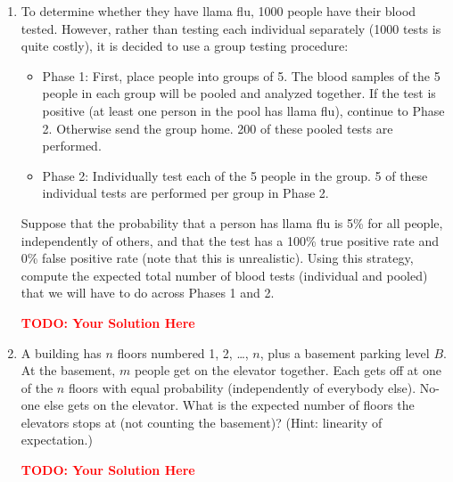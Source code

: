 \documentclass[12pt]{article}
\def\todo#1{\textcolor{red}{\textbf{#1}}}
\renewcommand{\|}{\mid}
\begin{document}
\begin{enumerate}
\item To determine whether they have llama flu, 1000 people have their blood tested. However, rather than testing each individual separately (1000 tests is quite costly), it is decided to use a group testing procedure:
\begin{itemize}
    \item Phase 1: First, place people into groups of 5. The blood samples of the 5 people in each
group will be pooled and analyzed together. If the test is positive (at least one person
in the pool has llama flu), continue to Phase 2. Otherwise send the group home. 200 of these pooled tests are performed.
\item Phase 2: Individually test each of the 5 people in the group. 5 of these individual tests are performed per group in Phase 2.
\end{itemize}
Suppose that the probability that a person has llama flu is 5\% for all people, independently
of others, and that the test has a 100\% true positive rate and 0\% false positive rate (note
that this is unrealistic). Using this strategy, compute the expected total number of blood tests
(individual and pooled) that we will have to do across Phases 1 and 2.

\begin{tcolorbox}
\todo{TODO: Your Solution Here}
\end{tcolorbox}

\item A building has $n$ floors numbered 1, 2, \ldots, $n$, plus a basement parking level $B$. At the basement, $m$ people get on the elevator together. Each gets off at one of the $n$ floors with equal probability (independently of everybody else). No-one else gets on the elevator. What is the expected number of floors the elevators stops at (not counting the basement)? (Hint: linearity of expectation.) 
    
\begin{tcolorbox}
\todo{TODO: Your Solution Here}
\end{tcolorbox}
    

\end{enumerate}
\end{document}
